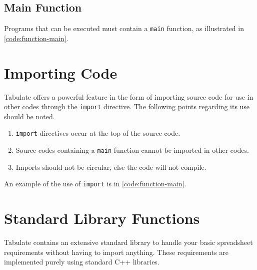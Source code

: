 \documentclass[conference,compsoc]{IEEEtran}
\begin{document}


\subsection{Main Function}
Programs that can be executed must contain a \texttt{main} function, as
illustrated in \autoref{code:function-main}.



\section{Importing Code}
Tabulate offers a powerful feature in the form of importing source code for use
in other codes through the \texttt{import} directive. The following points
regarding its use should be noted.

\begin{enumerate}
  \item \texttt{import} directives occur at the top of the source code.
  \item Source codes containing a \texttt{main} function cannot be imported in
  other codes. 
  \item Imports should not be circular, else the code will not compile.
\end{enumerate}

An example of the use of \texttt{import} is in \autoref{code:function-main}.

\section{Standard Library Functions}
Tabulate contains an extensive standard library to handle your basic spreadsheet
requirements without having to import anything. These requirements are
implemented purely using standard C++ libraries.
\end{document}
